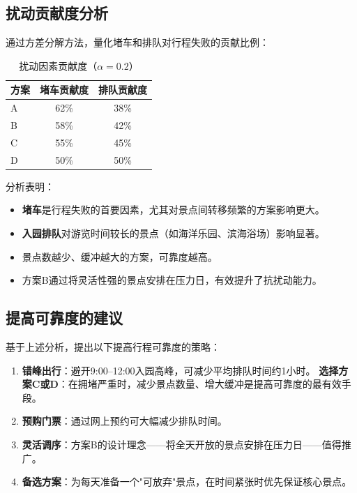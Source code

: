 \documentclass[12pt,a4paper]{ctexart}
\begin{document}
\subsection{扰动贡献度分析}

通过方差分解方法，量化堵车和排队对行程失败的贡献比例：

\begin{table}[H]
\centering
\caption{扰动因素贡献度（$\alpha=0.2$）}
\label{tab:contribution}
\begin{tabular}{lcc}
\toprule
\textbf{方案} & \textbf{堵车贡献度} & \textbf{排队贡献度} \\
\midrule
A & 62\% & 38\% \\
B & 58\% & 42\% \\
C & 55\% & 45\% \\
D & 50\% & 50\% \\
\bottomrule
\end{tabular}
\end{table}

分析表明：
\begin{itemize}
    \item \textbf{堵车}是行程失败的首要因素，尤其对景点间转移频繁的方案影响更大。
    \item \textbf{入园排队}对游览时间较长的景点（如海洋乐园、滨海浴场）影响显著。
    \item 景点数越少、缓冲越大的方案，可靠度越高。
    \item 方案B通过将灵活性强的景点安排在压力日，有效提升了抗扰动能力。
\end{itemize}

\subsection{提高可靠度的建议}

基于上述分析，提出以下提高行程可靠度的策略：
\begin{enumerate}
    \item \textbf{错峰出行}：避开9:00--12:00入园高峰，可减少平均排队时间约1小时。
    \textbf{选择方案C或D}：在拥堵严重时，减少景点数量、增大缓冲是提高可靠度的最有效手段。
    \item \textbf{预购门票}：通过网上预约可大幅减少排队时间。
    \item \textbf{灵活调序}：方案B的设计理念——将全天开放的景点安排在压力日——值得推广。
    \item \textbf{备选方案}：为每天准备一个"可放弃"景点，在时间紧张时优先保证核心景点。
\end{enumerate}
\end{document}

